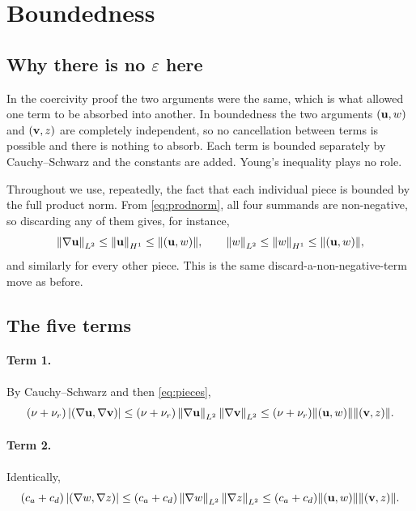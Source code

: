 \documentclass[11pt,a4paper]{article}
\begin{document}
\section{Boundedness}

\subsection{Why there is no $\varepsilon$ here}

In the coercivity proof the two arguments were the same, which is what allowed
one term to be absorbed into another. In boundedness the two arguments
$(\mathbf{u},w)$ and $(\mathbf{v},z)$ are completely independent, so no cancellation between
terms is possible and there is nothing to absorb. Each term is bounded
separately by Cauchy--Schwarz and the constants are added. Young's inequality
plays no role.

Throughout we use, repeatedly, the fact that each individual piece is bounded by
the full product norm. From \eqref{eq:prodnorm}, all four summands are
non-negative, so discarding any of them gives, for instance,
\begin{equation}\label{eq:pieces}
  \left\lVert \nabla \mathbf{u} \right\rVert_{L^{2}} \le \left\lVert \mathbf{u} \right\rVert_{H^{1}} \le \lVert (\mathbf{u},w) \rVert,
  \qquad
  \left\lVert w \right\rVert_{L^{2}} \le \left\lVert w \right\rVert_{H^{1}} \le \lVert (\mathbf{u},w) \rVert ,
\end{equation}
and similarly for every other piece. This is the same discard-a-non-negative-term
move as before.

\subsection{The five terms}

\paragraph{Term 1.} By Cauchy--Schwarz and then \eqref{eq:pieces},
\[
  (\nu+\nu_{r})\left\lvert \left( \nabla \mathbf{u} , \nabla \mathbf{v} \right) \right\rvert
  \le (\nu+\nu_{r}) \left\lVert \nabla \mathbf{u} \right\rVert_{L^{2}}\left\lVert \nabla \mathbf{v} \right\rVert_{L^{2}}
  \le (\nu+\nu_{r}) \lVert (\mathbf{u},w) \rVert \lVert (\mathbf{v},z) \rVert .
\]

\paragraph{Term 2.} Identically,
\[
  (c_{a}+c_{d})\left\lvert \left( \nabla w , \nabla z \right) \right\rvert
  \le (c_{a}+c_{d}) \left\lVert \nabla w \right\rVert_{L^{2}}\left\lVert \nabla z \right\rVert_{L^{2}}
  \le (c_{a}+c_{d}) \lVert (\mathbf{u},w) \rVert \lVert (\mathbf{v},z) \rVert .
\]
\end{document}
